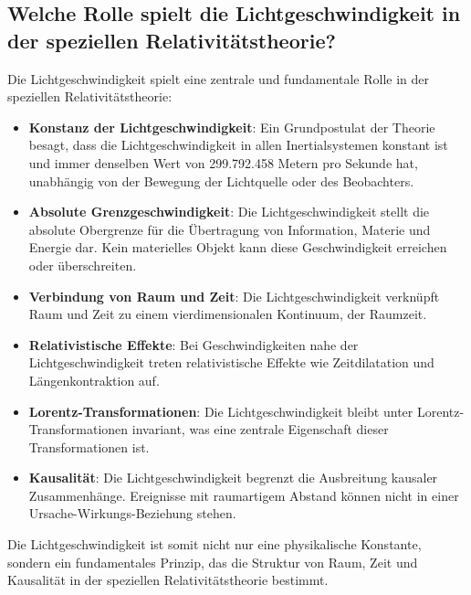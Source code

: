 \documentclass[a4paper,12pt]{article}
\begin{document}
	\subsection{Welche Rolle spielt die Lichtgeschwindigkeit in der speziellen Relativitätstheorie?}
	Die Lichtgeschwindigkeit spielt eine zentrale und fundamentale Rolle in der speziellen Relativitätstheorie:
	\begin{itemize}
		\item \textbf{Konstanz der Lichtgeschwindigkeit}: Ein Grundpostulat der Theorie besagt, dass die Lichtgeschwindigkeit in allen Inertialsystemen konstant ist und immer denselben Wert von 299.792.458 Metern pro Sekunde hat, unabhängig von der Bewegung der Lichtquelle oder des Beobachters.
		\item \textbf{Absolute Grenzgeschwindigkeit}: Die Lichtgeschwindigkeit stellt die absolute Obergrenze für die Übertragung von Information, Materie und Energie dar. Kein materielles Objekt kann diese Geschwindigkeit erreichen oder überschreiten.
		\item \textbf{Verbindung von Raum und Zeit}: Die Lichtgeschwindigkeit verknüpft Raum und Zeit zu einem vierdimensionalen Kontinuum, der Raumzeit.
		\item \textbf{Relativistische Effekte}: Bei Geschwindigkeiten nahe der Lichtgeschwindigkeit treten relativistische Effekte wie Zeitdilatation und Längenkontraktion auf.
		\item \textbf{Lorentz-Transformationen}: Die Lichtgeschwindigkeit bleibt unter Lorentz-Transformationen invariant, was eine zentrale Eigenschaft dieser Transformationen ist.
		\item \textbf{Kausalität}: Die Lichtgeschwindigkeit begrenzt die Ausbreitung kausaler Zusammenhänge. Ereignisse mit raumartigem Abstand können nicht in einer Ursache-Wirkungs-Beziehung stehen.
	\end{itemize}
	Die Lichtgeschwindigkeit ist somit nicht nur eine physikalische Konstante, sondern ein fundamentales Prinzip, das die Struktur von Raum, Zeit und Kausalität in der speziellen Relativitätstheorie bestimmt.
	
\end{document}
